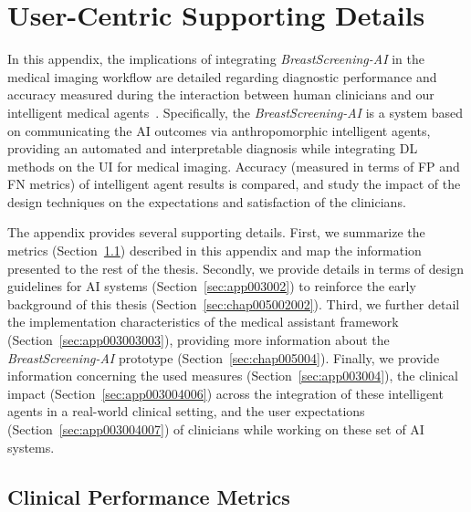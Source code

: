 \chapter{User-Centric Supporting Details}
\label{chap:app003}

In this appendix, the implications of integrating {\it BreastScreening-AI} in the medical imaging workflow are detailed regarding diagnostic performance and accuracy measured during the interaction between human clinicians and our intelligent medical agents~\cite{CALISTO2022102285}.
Specifically, the {\it BreastScreening-AI} is a system based on communicating the \ac{AI} outcomes via anthropomorphic intelligent agents, providing an automated and interpretable diagnosis while integrating \ac{DL} methods on the \ac{UI} for medical imaging.
Accuracy (measured in terms of \ac{FP} and \ac{FN} metrics) of intelligent agent results is compared, and study the impact of the design techniques on the expectations and satisfaction of the clinicians.

The appendix provides several supporting details.
First, we summarize the metrics (Section~\ref{sec:app003001}) described in this appendix and map the information presented to the rest of the thesis.
Secondly, we provide details in terms of design guidelines for \ac{AI} systems (Section~\ref{sec:app003002}) to reinforce the early background of this thesis (Section~\ref{sec:chap005002002}).
Third, we further detail the implementation characteristics of the medical assistant framework (Section~\ref{sec:app003003003}), providing more information about the {\it BreastScreening-AI} prototype (Section~\ref{sec:chap005004}).
Finally, we provide information concerning the used measures (Section~\ref{sec:app003004}), the clinical impact (Section~\ref{sec:app003004006}) across the integration of these intelligent agents in a real-world clinical setting, and the user expectations (Section~\ref{sec:app003004007}) of clinicians while working on these set of \ac{AI} systems.

\section{Clinical Performance Metrics}
\label{sec:app003001}

